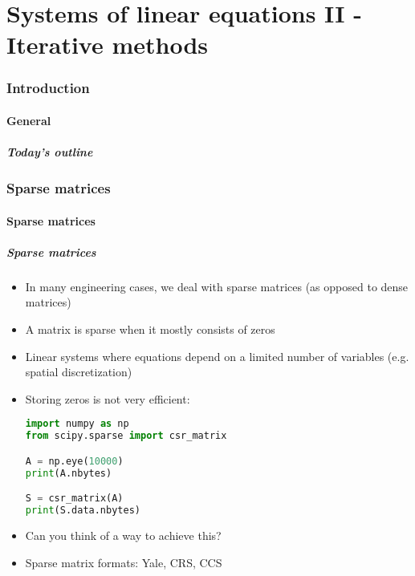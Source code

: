 \part{Systems of linear equations II - Iterative methods}
\section{Introduction}
\subsection*{General}
\begin{frame}[label=contents_lin3]
  \frametitle{Today's outline}
\end{frame}

\section{Sparse matrices}
\subsection*{Sparse matrices}

\begin{frame}[fragile]
  \frametitle{Sparse matrices}
  \begin{itemize}
    \item In many engineering cases, we deal with sparse matrices (as opposed to dense matrices)
    \item A matrix is sparse when it mostly consists of zeros
    \item Linear systems where equations depend on a limited number of variables (e.g. spatial discretization)
    \item Storing zeros is not very efficient:
    \begin{lstlisting}[language=Python]
import numpy as np
from scipy.sparse import csr_matrix

A = np.eye(10000)
print(A.nbytes)

S = csr_matrix(A)
print(S.data.nbytes)      
    \end{lstlisting}
    \item Can you think of a way to achieve this?
    \item Sparse matrix formats: Yale, CRS, CCS
\end{itemize}
\end{frame}

